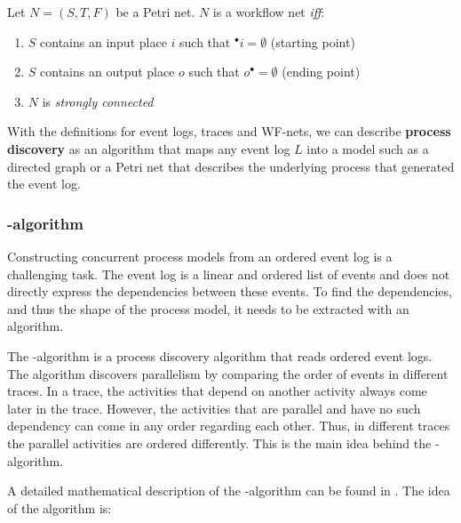 \begin{definition}
Let $N = (S, T, F)$ be a Petri net. $N$ is a workflow net \emph{iff}:
\begin{enumerate}
    \item $S$ contains an input place $i$ such that ${}^\bullet i = \emptyset$ (starting point)
    \item $S$ contains an output place $o$ such that $o^\bullet = \emptyset$ (ending point)
    \item $N$ is \textit{strongly connected}
\end{enumerate}
\end{definition}

With the definitions for event logs, traces and WF-nets, we can describe \textbf{process discovery} as an algorithm that maps any event log $L$ into a model such as a directed graph or a Petri net that describes the underlying process that generated the event log.

\subsubsection{\textalpha-algorithm}
\label{sec:alphaalgorithm}
Constructing concurrent process models from an ordered event log is a challenging task.
The event log is a linear and ordered list of events and does not directly express the dependencies between these events.
To find the dependencies, and thus the shape of the process model, it needs to be extracted with an algorithm.

The \textalpha-algorithm is a process discovery algorithm that reads ordered event logs.
The algorithm discovers parallelism by comparing the order of events in different traces.
In a trace, the activities that depend on another activity always come later in the trace.
However, the activities that are parallel and have no such dependency can come in any order regarding each other.
Thus, in different traces the parallel activities are ordered differently. 
This is the main idea behind the \textalpha-algorithm.

A detailed mathematical description of the \textalpha-algorithm can be found in \cite{van2004workflow}.
The idea of the algorithm is:

